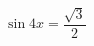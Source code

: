 \begin{ex}[type=equation]
	\begin{condition}
		$\ \sin 4x =\dfrac{\sqrt{3}}{2}$
	\end{condition}
\end{ex}